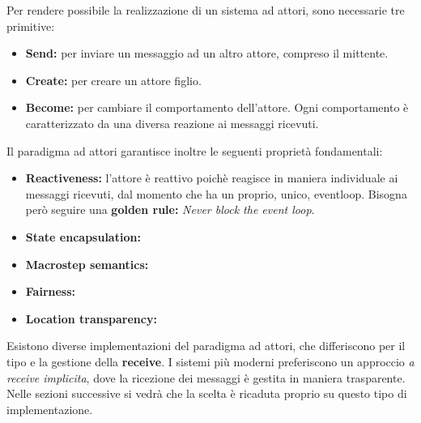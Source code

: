 	Per rendere possibile la realizzazione di un sistema ad attori, sono necessarie tre primitive:
	\begin{itemize}
		\item \textbf{Send:} per inviare un messaggio ad un altro attore, compreso il mittente.
		\item \textbf{Create:} per creare un attore figlio.
		\item \textbf{Become:} per cambiare il comportamento dell'attore. Ogni comportamento è caratterizzato da una diversa reazione ai messaggi ricevuti.
	\end{itemize}

	Il paradigma ad attori garantisce inoltre le seguenti proprietà fondamentali: 
	\begin{itemize}
		\item{\textbf{Reactiveness:}} l'attore è reattivo poichè reagisce in maniera individuale ai messaggi ricevuti, dal momento che ha un proprio, unico, eventloop. Bisogna però seguire una \textbf{golden rule:} \emph{Never block the event loop}.
		\item{\textbf{State encapsulation:}}
		\item{\textbf{Macrostep semantics:}}
		\item{\textbf{Fairness:}}
		\item{\textbf{Location transparency:}}
	\end{itemize}

	Esistono diverse implementazioni del paradigma ad attori, che differiscono per il tipo e la gestione della \textbf{receive}. I sistemi più moderni preferiscono un approccio \textit{a receive implicita}, dove la ricezione dei messaggi è gestita in maniera trasparente. Nelle sezioni successive si vedrà che la scelta è ricaduta proprio su questo tipo di implementazione.


